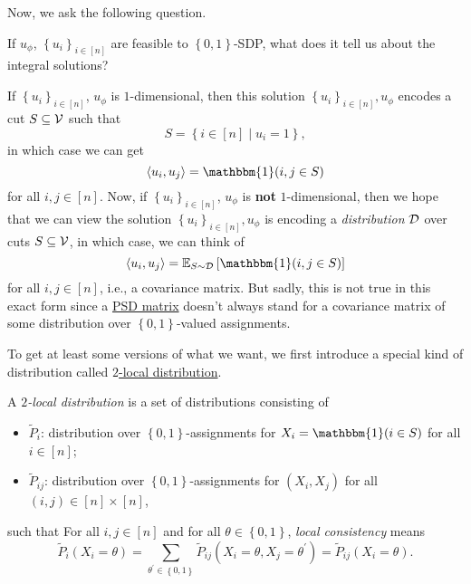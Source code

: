 Now, we ask the following question.

\begin{problem*}
	If \(u_\phi \), \(\left\{ u_{i}  \right\} _{i\in [n]}\) are feasible to \(\left\{ 0, 1 \right\} \)-SDP, what does it tell us about the integral solutions?
\end{problem*}
\begin{answer}
	If \(\left\{ u_i \right\} _{i\in [n]}\), \(u_\phi \) is \(1\)-dimensional, then this solution \(\left\{ u_i \right\} _{i\in [n]}, u_\phi\) encodes a cut \(S \subseteq \mathcal{\MakeUppercase{v}} \) such that
	\[
		S = \left\{ i\in [n] \mid u_i = 1 \right\},
	\]
	in which case we can get
	\[
		\left\langle u_i, u_j \right\rangle = \mathbbm{1}(i, j\in S)
	\]
	for all \(i, j\in [n]\). Now, if \(\left\{ u_i \right\} _{i\in [n]}\), \(u_\phi \) is \textbf{not} \(1\)-dimensional, then we hope that we can view the solution \(\left\{ u_i \right\} _{i\in [n]}, u_\phi \) is encoding a \emph{distribution} \(\mathcal{\MakeUppercase{d}} \) over cuts \(S \subseteq \mathcal{\MakeUppercase{v}} \), in which case, we can think of
	\[
		\left\langle u_i, u_j \right\rangle = \mathbb{E}_{S\sim \mathcal{\MakeUppercase{D}} }\left[ \mathbbm{1}(i, j\in S)\right]
	\]
	for all \(i, j\in [n]\), i.e., a covariance matrix. But sadly, this is not true in this exact form since a \hyperref[def:PSD]{PSD matrix} doesn't always stand for a covariance matrix of some distribution over \(\left\{ 0, 1 \right\} \)-valued assignments.
\end{answer}

To get at least some versions of what we want, we first introduce a special kind of distribution called \hyperref[def:2-local-distribution]{\(2\)-local distribution}.

\begin{definition}\label{def:2-local-distribution}
	A \emph{\(2\)-local distribution} is a set of distributions consisting of
	\begin{itemize}
		\item \(\widetilde{P} _i\): distribution over \(\left\{ 0, 1 \right\} \)-assignments for \(X_i= \mathbbm{1}(i\in S) \) for all \(i\in [n]\);
		\item \(\widetilde{P} _{ij}\): distribution over \(\left\{ 0, 1 \right\} \)-assignments for \((X_i, X_j)\) for all \((i, j)\in [n]\times [n]\),
	\end{itemize}
	such that For all \(i, j\in [n]\) and for all \(\theta \in \left\{ 0, 1 \right\} \), \emph{local consistency} means
	\[
		\widetilde{P} _i(X_i = \theta ) = \sum_{\theta ^\prime \in \left\{ 0, 1 \right\} } \widetilde{P} _{ij}(X_i=\theta , X_j = \theta ^\prime )= \widetilde{P} _{ij}(X_i = \theta ).
	\]
\end{definition}

